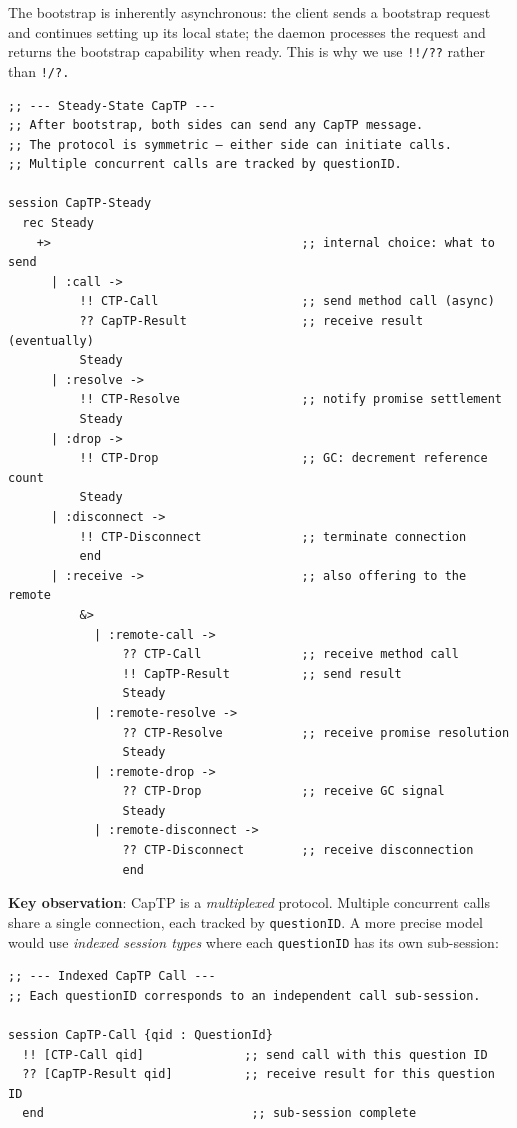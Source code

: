 \documentclass[11pt]{article}
\begin{document}
The bootstrap is inherently asynchronous: the client sends a bootstrap
request and continues setting up its local state; the daemon processes the
request and returns the bootstrap capability when ready. This is why we use
\texttt{!!/??} rather than \texttt{!/?.}

\begin{verbatim}
;; --- Steady-State CapTP ---
;; After bootstrap, both sides can send any CapTP message.
;; The protocol is symmetric — either side can initiate calls.
;; Multiple concurrent calls are tracked by questionID.

session CapTP-Steady
  rec Steady
    +>                                   ;; internal choice: what to send
      | :call ->
          !! CTP-Call                    ;; send method call (async)
          ?? CapTP-Result                ;; receive result (eventually)
          Steady
      | :resolve ->
          !! CTP-Resolve                 ;; notify promise settlement
          Steady
      | :drop ->
          !! CTP-Drop                    ;; GC: decrement reference count
          Steady
      | :disconnect ->
          !! CTP-Disconnect              ;; terminate connection
          end
      | :receive ->                      ;; also offering to the remote
          &>
            | :remote-call ->
                ?? CTP-Call              ;; receive method call
                !! CapTP-Result          ;; send result
                Steady
            | :remote-resolve ->
                ?? CTP-Resolve           ;; receive promise resolution
                Steady
            | :remote-drop ->
                ?? CTP-Drop              ;; receive GC signal
                Steady
            | :remote-disconnect ->
                ?? CTP-Disconnect        ;; receive disconnection
                end
\end{verbatim}

\textbf{Key observation}: CapTP is a \emph{multiplexed} protocol. Multiple concurrent
calls share a single connection, each tracked by \texttt{questionID}. A more precise
model would use \emph{indexed session types} where each \texttt{questionID} has its own
sub-session:

\begin{verbatim}
;; --- Indexed CapTP Call ---
;; Each questionID corresponds to an independent call sub-session.

session CapTP-Call {qid : QuestionId}
  !! [CTP-Call qid]              ;; send call with this question ID
  ?? [CapTP-Result qid]          ;; receive result for this question ID
  end                             ;; sub-session complete
\end{verbatim}
\end{document}

